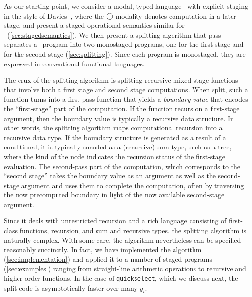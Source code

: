 As our starting point, we consider a modal, typed language \lang\ with explicit
staging in the style of Davies~\cite{davies96}, where the $\bigcirc$
modality denotes computation in a later stage, and present a staged
operational semantics similar for \lang\ (\ref{sec:stagedsemantics}).
We then present a splitting algorithm that pass-separates a \lang\ program
into two monostaged programs, one for the first stage and for the
second stage (\ref{sec:splitting}).  Since each program is monostaged,
they are expressed in conventional functional languages.

The crux of the splitting algorithm is splitting recursive mixed stage
functions that involve both a first stage and second stage
computations.  When split, such a function turns into a first-pass
function that yields a {\em boundary value} that encodes the
``first-stage'' part of the computation.  If the function recurs on a
first-stage argument, then the boundary value is typically a recursive
data structure.  In other words, the splitting algorithm maps
computational recursion into a recursive data type. If the boundary
structure is generated as a result of a conditional, it is typically
encoded as a (recursive) sum type, such as a tree, where the kind of
the node indicates the recursion status of the first-stage evaluation.
The second-pass part of the computation, which corresponds to the
``second stage'' takes the boundary value as an argument as well as
the second-stage argument and uses them to complete the computation,
often by traversing the now precomputed boundary in light of the now
available second-stage argument.

Since it deals with unrestricted recursion and a rich language
consisting of first-class functions, recursion, and sum and recursive
types, the splitting algorithm is naturally complex. With some care,
the algorithm nevertheless can be specified reasonably succinctly. In
fact, we have implemented the algorithm (\ref{sec:implementation}) and
applied it to a number of staged programs (\ref{sec:examples}) ranging
from straight-line arithmetic operations to recursive and higher-order
functions. In the case of \texttt{quickselect}, which we discuss next, 
the split code is asymptotically faster over many $y_i$.

